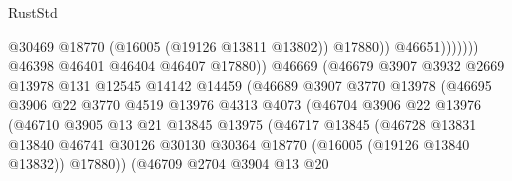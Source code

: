 \begin{lexlean}{RustStd}
\begin{coremodule}
                                                  @30469
                                                  @18770
                                                  (@16005 (@19126 @13811 @13802))
                                                  @17880))
                                              @46651)))))))
                                @46398
                                @46401
                                @46404
                                @46407
                                @17880))
                            @46669
                            (@46679
                              @3907
                              @3932
                              @2669
                              @13978
                              @131
                              @12545
                              @14142
                              @14459
                              (@46689
                                @3907
                                @3770
                                @13978
                                (@46695
                                  @3906
                                  @22
                                  @3770
                                  @4519
                                  @13976
                                  @4313
                                  @4073
                                  (@46704
                                    @3906
                                    @22
                                    @13976
                                    (@46710
                                      @3905
                                      @13
                                      @21
                                      @13845
                                      @13975
                                      (@46717
                                        @13845
                                        (@46728
                                          @13831
                                          @13840
                                          @46741
                                          @30126
                                          @30130
                                          @30364
                                          @18770
                                          (@16005 (@19126 @13840 @13832))
                                          @17880))
                                      (@46709
                                        @2704
                                        @3904
                                        @13
                                        @20

\end{coremodule}
\end{lexlean}
